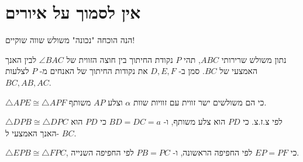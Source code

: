 \documentclass[12pt,a4paper]{article}
\begin{document}


\newpage
\appendix

\section{אין לסמוך על איורים}
הנה הוכחה "נכונה"
\textbf{}
משולש שווה שוקיים!

נתון משולש שרירותי 
$ABC$,
תהי
$P$
נקודת החיתוך בין חוצה הזווית של
$\angle BAC$
לבין האנך האמצעי של 
$BC$.
סמן ב-%
$D,E,F$
את נקודות החיתוך של האנחים מ-%
$P$
לצלעות
$BC,AB,AC$.

$\triangle APE\cong \triangle APF$
כי הם משולשים ישר זווית עם זוויות שוות
$\alpha$
וצלע $AP$ משותף.

$\triangle DPB\cong \triangle DPC$
לפי צ.ז.צ. כי 
$PD$
הוא צלע משותף, ו-%
$BD=DC=a$
כי 
$PD$
הוא האנך האמצעי ל-%
$BC$.

$\triangle EPB\cong \triangle FPC$,
כי
$EP=PF$
לפי החפיפה הראשונה, ו-%
$PB=PC$
לפי החפיפה השנייה.
\end{document}
